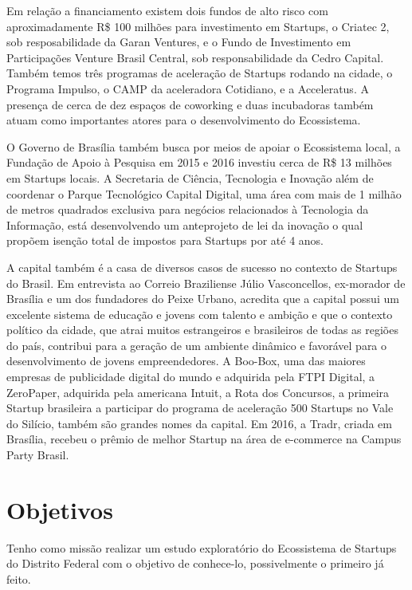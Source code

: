 Em relação a financiamento existem dois fundos de alto risco com aproximadamente R\$ 100 milhões para investimento em Startups, o Criatec 2, sob resposabilidade da Garan Ventures, e o Fundo de Investimento em Participações Venture Brasil Central, sob responsabilidade da Cedro Capital. Também temos três programas de aceleração de Startups rodando na cidade, o Programa Impulso, o CAMP da aceleradora Cotidiano, e a Acceleratus. A presença de cerca de dez espaços de coworking e duas incubadoras também atuam como importantes atores para o desenvolvimento do Ecossistema.

O Governo de Brasília também busca por meios de apoiar o Ecossistema local, a Fundação de Apoio à Pesquisa em 2015 e 2016 investiu cerca de R\$ 13 milhões em Startups locais. A Secretaria de Ciência, Tecnologia e Inovação além de coordenar o Parque Tecnológico Capital Digital, uma área com mais de 1 milhão de metros quadrados exclusiva para negócios relacionados à Tecnologia da Informação, está desenvolvendo um anteprojeto de lei da inovação o qual propõem isenção total de impostos para Startups por até 4 anos. 

A capital também é a casa de diversos casos de sucesso no contexto de Startups do Brasil. Em entrevista ao Correio Braziliense Júlio Vasconcellos, ex-morador de Brasília e um dos fundadores do Peixe Urbano, acredita que a capital possui um excelente sistema de educação e jovens com talento e ambição e que o contexto político da cidade, que atrai muitos estrangeiros e brasileiros de todas as regiões do país, contribui para a geração de um ambiente dinâmico e favorável para o desenvolvimento de jovens empreendedores. A Boo-Box, uma das maiores empresas de publicidade digital do mundo e adquirida pela FTPI Digital, a ZeroPaper, adquirida pela americana Intuit, a Rota dos Concursos, a primeira Startup brasileira a participar do programa de aceleração 500 Startups no Vale do Silício, também são grandes nomes da capital. Em 2016, a Tradr, criada em Brasília, recebeu o prêmio de melhor Startup na área de e-commerce na Campus Party Brasil.

\section{Objetivos}
\label{section:objetivos}

Tenho como missão realizar um estudo exploratório do Ecossistema de Startups do Distrito Federal com o objetivo de conhece-lo, possivelmente o primeiro já feito.

